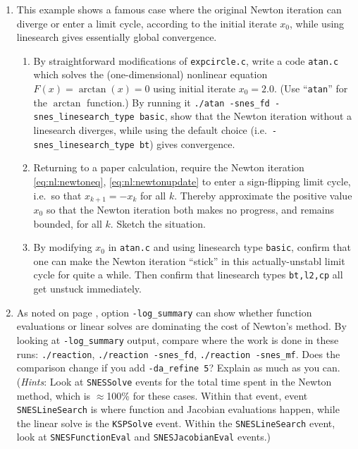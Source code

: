 \begin{enumerate}
\item  \label{exer:newtonatan}
This example shows a famous case where the original Newton iteration can diverge or enter a limit cycle, according to the initial iterate $x_0$, while using linesearch gives essentially global convergence.
    \begin{enumerate}
    \item By straightforward modifications of \texttt{expcircle.c}, write a code \texttt{atan.c} which solves the (one-dimensional) nonlinear equation $F(x)=\arctan(x)=0$ using initial iterate $x_0=2.0$.  (Use ``\texttt{atan}'' for the $\arctan$ function.)  By running it \texttt{./atan -snes\_fd -snes\_linesearch\_type basic}, show that the Newton iteration without a linesearch diverges, while using the default choice (i.e.~\texttt{-snes\_linesearch\_type bt}) gives convergence.
    \item Returning to a paper calculation, require the Newton iteration \eqref{eq:nl:newtoneq}, \eqref{eq:nl:newtonupdate} to enter a sign-flipping limit cycle, i.e.~so that $x_{k+1} = - x_k$ for all $k$.  Thereby approximate the positive value $x_0$ so that the Newton iteration both makes no progress, and remains bounded, for all $k$.  Sketch the situation.
    \item By modifying $x_0$ in \texttt{atan.c} and using linesearch type \texttt{basic}, confirm that one can make the Newton iteration ``stick'' in this actually-unstabl limit cycle for quite a while.  Then confirm that linesearch types \texttt{bt,l2,cp} all get unstuck immediately.
    \end{enumerate}

\item As noted on page \pageref{sidenote:logsummary}, \PETSc option \texttt{-log\_summary} can show whether function evaluations or linear solves are dominating the cost of Newton's method.  By looking at \texttt{-log\_summary} output, compare where the work is done in these runs: \texttt{./reaction}, \texttt{./reaction -snes\_fd}, \texttt{./reaction -snes\_mf}.  Does the comparison change if you add \texttt{-da\_refine 5}?  Explain as much as you can.  (\emph{Hints}: Look at \texttt{SNESSolve} events for the total time spent in the Newton method, which is $\approx$100\% for these cases.  Within that event, event \texttt{SNESLineSearch} is where function and Jacobian evaluations happen, while the linear solve is the \texttt{KSPSolve} event.  Within the \texttt{SNESLineSearch} event, look at \texttt{SNESFunctionEval} and \texttt{SNESJacobianEval} events.)


\end{enumerate}
